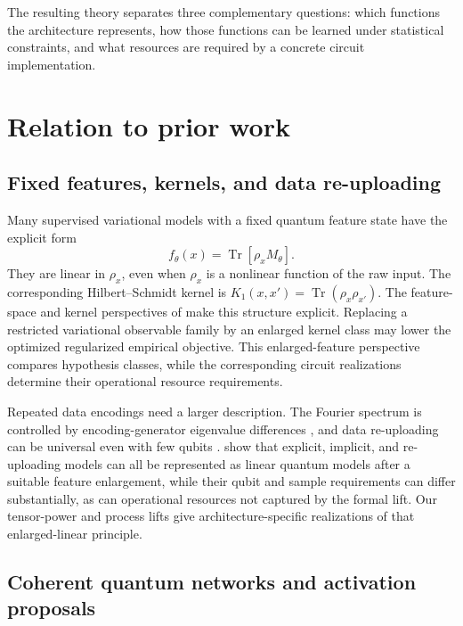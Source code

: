 \documentclass[pdflatex,sn-mathphys,NameDate,iicol]{sn-jnl}
\newcommand{\Tr}{\operatorname{Tr}}
\begin{document}
The resulting theory separates three complementary questions: which functions
the architecture represents, how those functions can be learned under
statistical constraints, and what resources are required by a concrete circuit
implementation.

\section{Relation to prior work}
\label{sec:related}

\subsection{Fixed features, kernels, and data re-uploading}

Many supervised variational models with a fixed quantum feature state have
the explicit form
\begin{equation}
  f_\theta(x)=\Tr[\rho_x M_\theta].
  \label{eq:single-copy-model}
\end{equation}
They are linear in $\rho_x$, even when $\rho_x$ is a nonlinear function of
the raw input. The corresponding Hilbert--Schmidt kernel is
$K_1(x,x')=\Tr(\rho_x\rho_{x'})$. The feature-space and kernel perspectives of
\citet{schuld2019feature,schuld2021kernel} make this structure explicit.
Replacing a restricted variational observable family by an enlarged kernel
class may lower the optimized regularized empirical objective. This
enlarged-feature perspective compares hypothesis classes, while the
corresponding circuit realizations determine their operational resource
requirements.

Repeated data encodings need a larger description. The Fourier spectrum is
controlled by encoding-generator eigenvalue differences
\citep{schuld2021encoding}, and data re-uploading can be universal even with
few qubits \citep{perezsalinas2020reuploading}. \citet{jerbi2023beyond}
show that explicit, implicit, and re-uploading models can all be represented
as linear quantum models after a suitable feature enlargement, while their
qubit and sample requirements can differ substantially, as can operational
resources not captured by the formal lift. Our tensor-power and process lifts
give architecture-specific realizations of that enlarged-linear principle.

\subsection{Coherent quantum networks and activation proposals}
\end{document}

